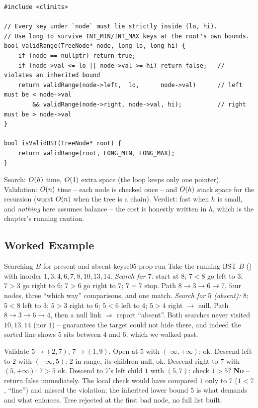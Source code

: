 \begin{lstlisting}[caption={Validate a candidate BST with the bound descent -- the fix for the local-check trap}, label={lst:c05-validate}]
#include <climits>

// Every key under `node` must lie strictly inside (lo, hi).
// Use long to survive INT_MIN/INT_MAX keys at the root's own bounds.
bool validRange(TreeNode* node, long lo, long hi) {
    if (node == nullptr) return true;
    if (node->val <= lo || node->val >= hi) return false;   // violates an inherited bound
    return validRange(node->left,  lo,      node->val)      // left must be < node->val
        && validRange(node->right, node->val, hi);          // right must be > node->val
}

bool isValidBST(TreeNode* root) {
    return validRange(root, LONG_MIN, LONG_MAX);
}
\end{lstlisting}
\begin{complexitybox}
Search: $O(h)$ time, $O(1)$ extra space (the loop keeps only one pointer). Validation:
$O(n)$ time -- each node is checked once -- and $O(h)$ stack space for the recursion (worst
$O(n)$ when the tree is a chain). Verdict: fast when $h$ is small, and \emph{nothing} here
assumes balance -- the cost is honestly written in $h$, which is the chapter's running caution.
\end{complexitybox}

\subsection{Worked Example}

\begin{example}{Searching $B$ for present and absent keys}{c05-prop-run}
Take the running BST $B$ () with inorder $1,3,4,6,7,8,10,13,14$.
\emph{Search for $7$:} start at $8$; $7<8$ go left to $3$; $7>3$ go right to $6$; $7>6$ go right to
$7$; $7=7$ stop. Path $8\to3\to6\to7$, four nodes, three ``which way'' comparisons, and one match.
\emph{Search for $5$ (absent):} $8$; $5<8$ left to $3$; $5>3$ right to $6$; $5<6$ left to $4$;
$5>4$ right $\to$ null. Path $8\to3\to6\to4$, then a null link $\Rightarrow$ report ``absent''. Both
searches never visited $10,13,14$ (nor $1$) --  guarantees the target could not
hide there, and indeed the sorted line shows $5$ sits between $4$ and $6$, which we walked past.
\end{example}
\begin{tracebox}
Validate $5\!\to\!(2,7)$, $7\!\to\!(1,9)$. Open at $5$ with $(\text{-}\infty,+\infty)$: ok.
Descend left to $2$ with $(-\infty,5)$: $2$ in range, its children null, ok. Descend right to $7$
with $(5,+\infty)$: $7>5$ ok. Descend to $7$'s left child $1$ with $(5,7)$: check $1>5$? \textbf{No}
-- return false immediately. The local check would have compared $1$ only to $7$ ($1<7$, ``fine'')
and missed the violation; the inherited lower bound $5$ is what  demands and what
 enforces. Tree rejected at the first bad node, no full list built.
\end{tracebox}

